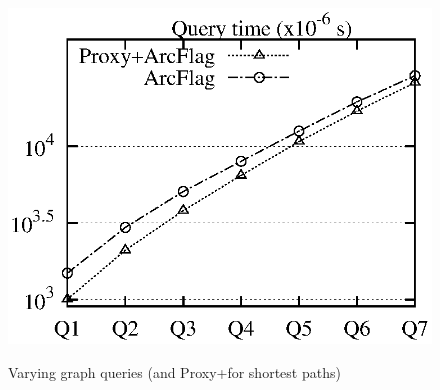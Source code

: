 \begin{figure}[t!]
\begin{center}
{\includegraphics[scale=0.422]{./exp/query_cus_path_af.eps}}
\end{center}
\vspace{-0.5ex}
\caption{Varying graph queries (\arcflag and Proxy+\arcflag for shortest paths)}
\label{fig:performance_path_queries_af}
\vspace{-1ex}
\end{figure}
